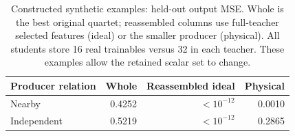 \begin{table}[t]
\centering\footnotesize
\caption{Constructed synthetic examples: held-out output MSE. Whole is the best original quartet; reassembled columns use full-teacher selected features (ideal) or the smaller producer (physical). All students store 16 real trainables versus 32 in each teacher. These examples allow the retained scalar set to change.}
\label{tab:synthetic}
\begin{tabular}{lrrr}
\toprule
Producer relation & Whole & Reassembled ideal & Physical \\
\midrule
Nearby & 0.4252 & $<10^{-12}$ & 0.0010 \\
Independent & 0.5219 & $<10^{-12}$ & 0.2865 \\
\bottomrule
\end{tabular}
\end{table}
